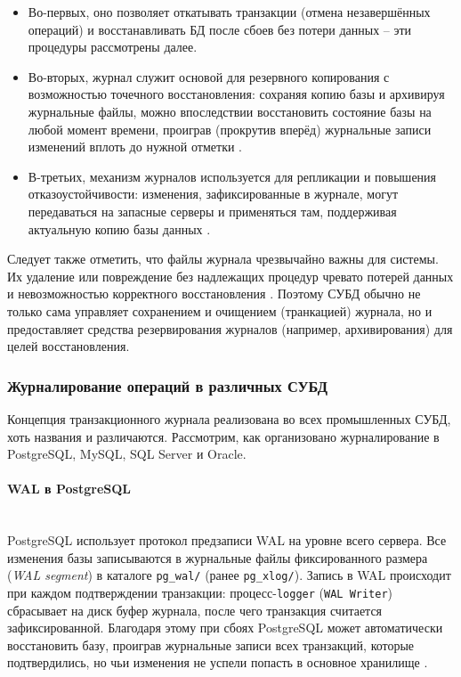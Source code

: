  \begin{itemize}
    \item Во-первых, оно позволяет откатывать транзакции (отмена незавершённых операций) и восстанавливать БД после сбоев без потери данных – эти процедуры рассмотрены далее. 
    \item Во-вторых, журнал служит основой для резервного копирования с возможностью точечного восстановления: сохраняя копию базы и архивируя журнальные файлы, можно впоследствии восстановить состояние базы на любой момент времени, проиграв (прокрутив вперёд) журнальные записи изменений вплоть до нужной отметки \autocite{PostgreSQLdocc28}. 
    \item В-третьих, механизм журналов используется для репликации и повышения отказоустойчивости: изменения, зафиксированные в журнале, могут передаваться на запасные серверы и применяться там, поддерживая актуальную копию базы данных \autocite{Mysqldoc7}. 
 \end{itemize}
 Следует также отметить, что файлы журнала чрезвычайно важны для системы. Их удаление или повреждение без надлежащих процедур чревато потерей данных и невозможностью корректного восстановления \autocite{MicrosoftLearnSQLserverTransLog}. Поэтому СУБД обычно не только сама управляет сохранением и очищением (транкацией) журнала, но и предоставляет средства резервирования журналов (например, архивирования) для целей восстановления.

\subsubsection{Журналирование операций в различных СУБД} 

 Концепция транзакционного журнала реализована во всех промышленных СУБД, хоть названия и различаются. Рассмотрим, как организовано журналирование в PostgreSQL, MySQL, SQL Server и Oracle. 

 \paragraph{WAL в PostgreSQL} ~\\

 PostgreSQL использует протокол предзаписи WAL на уровне всего сервера. Все изменения базы записываются в журнальные файлы фиксированного размера (\textit{WAL segment}) в каталоге \texttt{pg\_wal/} (ранее \texttt{pg\_xlog/}). Запись в WAL происходит при каждом подтверждении транзакции: процесс-\texttt{logger} (\texttt{WAL Writer}) сбрасывает на диск буфер журнала, после чего транзакция считается зафиксированной. Благодаря этому при сбоях PostgreSQL может автоматически восстановить базу, проиграв журнальные записи всех транзакций, которые подтвердились, но чьи изменения не успели попасть в основное хранилище \autocite{PostgreSQLdocc28}. 
 
